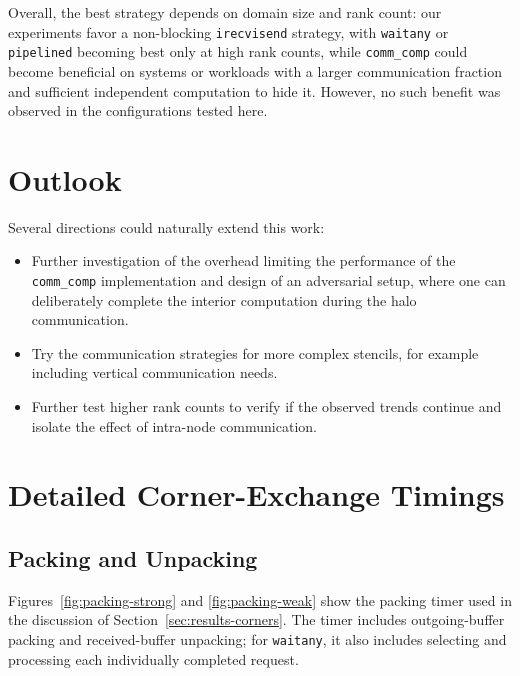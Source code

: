 \documentclass{article}
\begin{document}
Overall, the best strategy depends on domain size and rank count: our experiments favor a non-blocking \texttt{irecvisend} strategy, with \texttt{waitany} or \texttt{pipelined} becoming best only at high rank counts, while \texttt{comm\_comp}  could become beneficial on systems or workloads with a larger communication fraction and sufficient independent computation to hide it. However, no such benefit was observed in the configurations tested here.



\section{Outlook}
\label{sec:outlook}

Several directions could naturally extend this work:

\begin{itemize}
    \item Further investigation of the overhead limiting the performance of the \texttt{comm\_comp} implementation and design of an adversarial setup, where one can deliberately complete the interior computation during the halo communication.
    \item Try the communication strategies for more complex stencils, for example including vertical communication needs.
    \item Further test higher rank counts to verify if the observed trends continue and isolate the effect of intra-node communication.
\end{itemize}

\newpage

\appendix
\section{Detailed Corner-Exchange Timings}
\label{app:detailed-corner-timings}

\subsection{Packing and Unpacking}
\label{app:corner-packing}

Figures~\ref{fig:packing-strong} and \ref{fig:packing-weak} show the
packing timer used in the discussion of Section~\ref{sec:results-corners}.
The timer includes outgoing-buffer packing and received-buffer unpacking;
for \texttt{waitany}, it also includes selecting and processing each
individually completed request.
\end{document}
